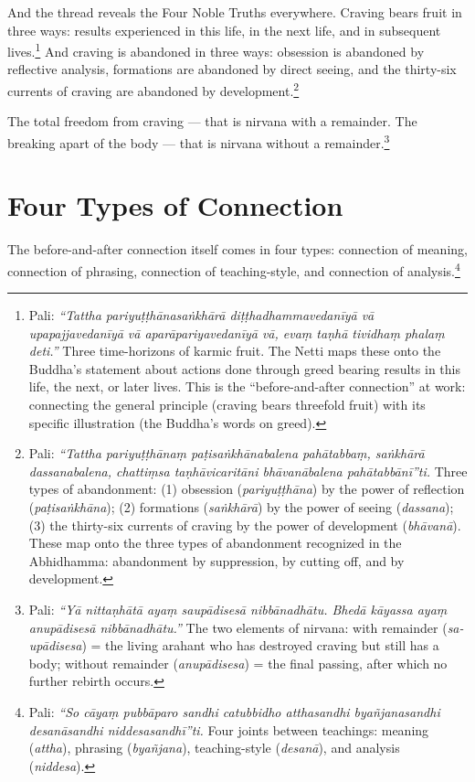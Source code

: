 And the thread reveals the Four Noble Truths everywhere. Craving bears fruit in three ways: results experienced in this life, in the next life, and in subsequent lives.\footnote{Pali: \textit{``Tattha pariyuṭṭhānasaṅkhārā diṭṭhadhammavedanīyā vā upapajjavedanīyā vā aparāpariyavedanīyā vā, evaṃ taṇhā tividhaṃ phalaṃ deti.''} Three time-horizons of karmic fruit. The Netti maps these onto the Buddha's statement about actions done through greed bearing results in this life, the next, or later lives. This is the ``before-and-after connection'' at work: connecting the general principle (craving bears threefold fruit) with its specific illustration (the Buddha's words on greed).} And craving is abandoned in three ways: obsession is abandoned by reflective analysis, formations are abandoned by direct seeing, and the thirty-six currents of craving are abandoned by development.\footnote{Pali: \textit{``Tattha pariyuṭṭhānaṃ paṭisaṅkhānabalena pahātabbaṃ, saṅkhārā dassanabalena, chattiṃsa taṇhāvicaritāni bhāvanābalena pahātabbānī''ti.} Three types of abandonment: (1) obsession (\textit{pariyuṭṭhāna}) by the power of reflection (\textit{paṭisaṅkhāna}); (2) formations (\textit{saṅkhārā}) by the power of seeing (\textit{dassana}); (3) the thirty-six currents of craving by the power of development (\textit{bhāvanā}). These map onto the three types of abandonment recognized in the Abhidhamma: abandonment by suppression, by cutting off, and by development.}

The total freedom from craving --- that is nirvana with a remainder. The breaking apart of the body --- that is nirvana without a remainder.\footnote{Pali: \textit{``Yā nittaṇhātā ayaṃ saupādisesā nibbānadhātu. Bhedā kāyassa ayaṃ anupādisesā nibbānadhātu.''} The two elements of nirvana: with remainder (\textit{sa-upādisesa}) = the living arahant who has destroyed craving but still has a body; without remainder (\textit{anupādisesa}) = the final passing, after which no further rebirth occurs.}

\section*{Four Types of Connection}

The before-and-after connection itself comes in four types: connection of meaning, connection of phrasing, connection of teaching-style, and connection of analysis.\footnote{Pali: \textit{``So cāyaṃ pubbāparo sandhi catubbidho atthasandhi byañjanasandhi desanāsandhi niddesasandhī''ti.} Four joints between teachings: meaning (\textit{attha}), phrasing (\textit{byañjana}), teaching-style (\textit{desanā}), and analysis (\textit{niddesa}).}

